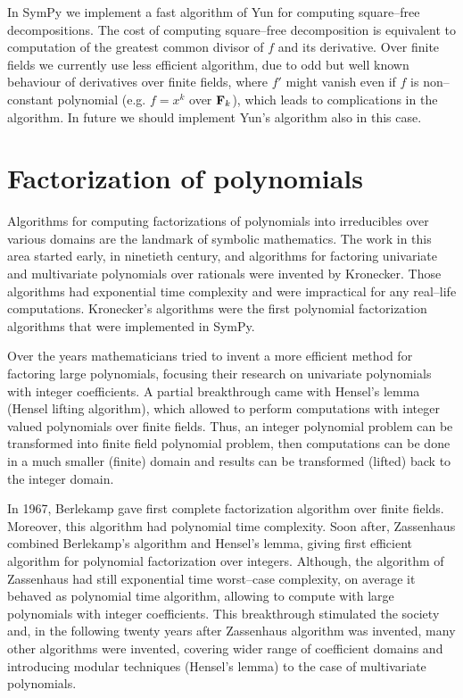 In SymPy we implement a fast algorithm of Yun \cite{Yun1976squarefree} for computing square--free
decompositions. The cost of computing square--free decomposition is equivalent to computation
of the greatest common divisor of $f$ and its derivative. Over finite fields we currently use
less efficient algorithm, due to odd but well known behaviour of derivatives over finite fields,
where $f'$ might vanish even if $f$ is non--constant polynomial (e.g. $f = x^k$ over $\mathbf{F}_k$),
which leads to complications in the algorithm. In future we should implement Yun's algorithm
also in this case.


\section{Factorization of polynomials}

Algorithms for computing factorizations of polynomials into irreducibles over various domains
are the landmark of symbolic mathematics. The work in this area started early, in ninetieth
century, and algorithms for factoring univariate and multivariate polynomials over rationals
were invented by Kronecker. Those algorithms had exponential time complexity and were impractical
for any real--life computations. Kronecker's algorithms were the first polynomial factorization
algorithms that were implemented in SymPy.

Over the years mathematicians tried to invent a more efficient method for factoring large polynomials,
focusing their research on univariate polynomials with integer coefficients. A partial breakthrough
came with Hensel's lemma (Hensel lifting algorithm), which allowed to perform computations with integer
valued polynomials over finite fields. Thus, an integer polynomial problem can be transformed into
finite field polynomial problem, then computations can be done in a much smaller (finite) domain and
results can be transformed (lifted) back to the integer domain.

In 1967, Berlekamp gave first complete factorization algorithm over finite fields. Moreover, this
algorithm had polynomial time complexity. Soon after, Zassenhaus combined Berlekamp's algorithm and
Hensel's lemma, giving first efficient algorithm for polynomial factorization over integers. Although,
the algorithm of Zassenhaus had still exponential time worst--case complexity, on average it behaved
as polynomial time algorithm, allowing to compute with large polynomials with integer coefficients.
This breakthrough stimulated the society and, in the following twenty years after Zassenhaus algorithm
was invented, many other algorithms were invented, covering wider range of coefficient domains and
introducing modular techniques (Hensel's lemma) to the case of multivariate polynomials.


